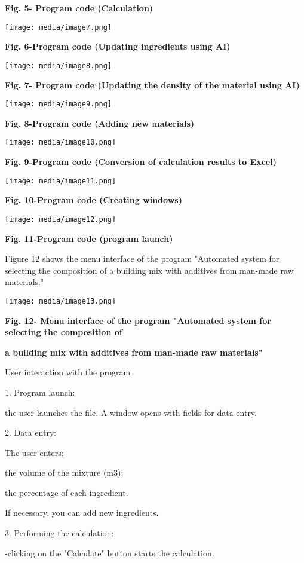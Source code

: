\documentclass[
]{article}
\begin{document}
\textbf{Fig. 5- Program code (Calculation)}

\texttt{[image: media/image7.png]}

\textbf{Fig. 6-Program code (Updating ingredients using AI)}

\texttt{[image: media/image8.png]}

\textbf{Fig. 7- Program code (Updating the density of the material using
AI)}

\texttt{[image: media/image9.png]}

\textbf{Fig. 8-Program code (Adding new materials)}

\texttt{[image: media/image10.png]}

\textbf{Fig. 9-Program code (Conversion of calculation results to
Excel)}

\texttt{[image: media/image11.png]}

\textbf{Fig. 10-Program code (Creating windows)}

\texttt{[image: media/image12.png]}

\textbf{Fig. 11-Program code (program launch)}

Figure 12 shows the menu interface of the program "Automated system for
selecting the composition of a building mix with additives from man-made
raw materials."

\texttt{[image: media/image13.png]}

\textbf{Fig. 12- Menu interface of the program "Automated system for
selecting the composition of}

\textbf{a building mix with additives from man-made raw materials"}

User interaction with the program

1. Program launch:

the user launches the file. A window opens with fields for data entry.

2. Data entry:

The user enters:

the volume of the mixture (m3);

the percentage of each ingredient.

If necessary, you can add new ingredients.

3. Performing the calculation:

-clicking on the "Calculate" button starts the calculation.
\end{document}
